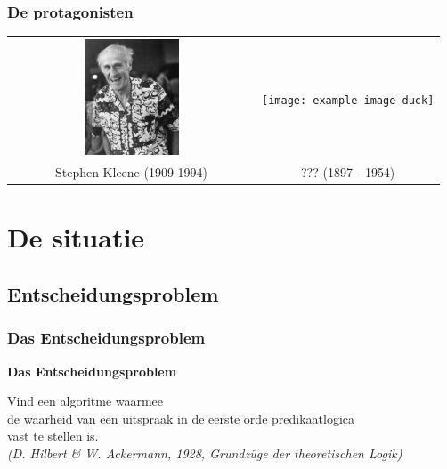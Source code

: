 \documentclass[handout]{beamer}
\begin{document}
\begin{frame}
    \frametitle{De protagonisten}
    \begin{tabular*}{\textwidth}{c c}
        \includegraphics[width=0.4\textwidth]{Kleene.jpeg} & \texttt{[image: example-image-duck]} \\
        {\large Stephen Kleene} (1909-1994) & {\large ???} (1897 - 1954)\\
    \end{tabular*}
\end{frame}

\section{De situatie}
\subsection{Entscheidungsproblem}
\begin{frame}
    \frametitle{Das Entscheidungsproblem}
    {\large \textbf{Das Entscheidungsproblem}}

    \begin{center}
        Vind een algoritme waarmee \\ 
        de waarheid van een uitspraak in de eerste orde predikaatlogica \\
        vast te stellen is.
        \\
        \bigskip
        {\small \emph{(D. Hilbert \& W. Ackermann, 1928, Grundzüge der theoretischen Logik)}}
    \end{center}
\end{frame}
\end{document}
